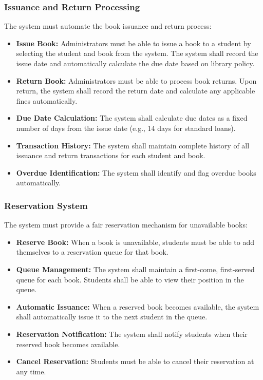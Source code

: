 \documentclass[12pt,a4paper]{report}
\begin{document}
\subsubsection{Issuance and Return Processing}

The system must automate the book issuance and return process:

\begin{itemize}
    \item \textbf{Issue Book:} Administrators must be able to issue a book to a student by selecting the student and book from the system. The system shall record the issue date and automatically calculate the due date based on library policy.
    
    \item \textbf{Return Book:} Administrators must be able to process book returns. Upon return, the system shall record the return date and calculate any applicable fines automatically.
    
    \item \textbf{Due Date Calculation:} The system shall calculate due dates as a fixed number of days from the issue date (e.g., 14 days for standard loans).
    
    \item \textbf{Transaction History:} The system shall maintain complete history of all issuance and return transactions for each student and book.
    
    \item \textbf{Overdue Identification:} The system shall identify and flag overdue books automatically.
\end{itemize}

\subsubsection{Reservation System}

The system must provide a fair reservation mechanism for unavailable books:

\begin{itemize}
    \item \textbf{Reserve Book:} When a book is unavailable, students must be able to add themselves to a reservation queue for that book.
    
    \item \textbf{Queue Management:} The system shall maintain a first-come, first-served queue for each book. Students shall be able to view their position in the queue.
    
    \item \textbf{Automatic Issuance:} When a reserved book becomes available, the system shall automatically issue it to the next student in the queue.
    
    \item \textbf{Reservation Notification:} The system shall notify students when their reserved book becomes available.
    
    \item \textbf{Cancel Reservation:} Students must be able to cancel their reservation at any time.
    
\end{itemize}
\end{document}
